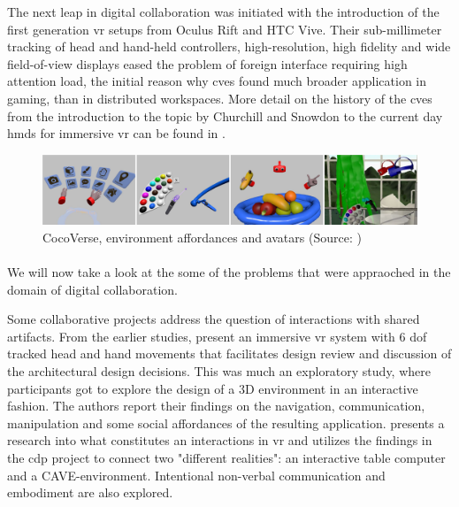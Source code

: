 The next leap in digital collaboration was initiated with the introduction of the first generation \gls{vr} setups from Oculus Rift and HTC Vive. Their sub-millimeter tracking of head and hand-held controllers, high-resolution, high fidelity and wide field-of-view displays eased the problem of foreign interface  requiring high attention load, the initial reason why \gls{cve}s found much broader application in gaming, than in distributed workspaces. More detail on the history of the \gls{cve}s from the introduction to the topic by Churchill and Snowdon to the current day \gls{hmd}s for immersive \gls{vr} can be found in \cite{greenwald_technology_2017}.

\begin{figure}
	\centering
	\includegraphics[width=0.7\linewidth]{figures/Cocoverse}
	\caption{CocoVerse, environment affordances and avatars (Source: \cite{greenwald_cocoverse_nodate})}
	\label{fig:cocoverse}
\end{figure}

\paragraph[Related Work]{}
We will now take a look at the some of the problems that were appraoched in the domain of digital collaboration.

Some collaborative projects address the question of interactions with shared artifacts. From the earlier studies, \cite{davidson_greenspace_1996} present an immersive \gls{vr} system with 6 \gls{dof} tracked head and hand movements that facilitates design review and discussion of the architectural design decisions. This was much an exploratory study, where participants got to explore the design of a 3D environment in an interactive fashion. The authors report their findings on the navigation, communication, manipulation and some social affordances of the resulting application.
\cite{lena_real-time_nodate} presents a research into what constitutes an interactions in \gls{vr} and utilizes the findings in the \gls{cdp} project to connect two "different realities": an interactive table computer and a CAVE-environment. Intentional non-verbal communication and embodiment are also explored.

